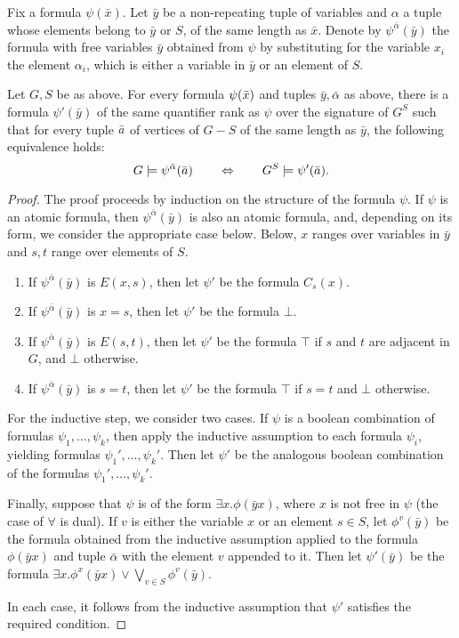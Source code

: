 Fix a formula $\psi(\bar x)$.
Let $\bar y$ be a non-repeating tuple of variables and $\alpha$ a tuple whose elements belong to $\bar y$ or $S$, of the same length as $\bar x$.
Denote by $\psi^{\bar \alpha}(\bar y)$ the formula with free variables $\bar y$ obtained from $\psi$ by substituting for the variable $x_i$ the element $\alpha_i$, which is either a variable in $\bar y$  or an element of $S$. 


\begin{lemma}\label{lem:remove-s}Let $G,S$ be as above.	
For every formula $\psi(\bar{x})$ and tuples $\bar y,\bar\alpha$ as above,
there is a formula $\psi'(\bar y)$ 
of the same quantifier rank as $\psi$ over the signature of $G^S$ 
 such that for every tuple $\bar{a}$ of vertices of $G-S$
 of the same length as $\bar y$,
the following equivalence holds:
$$G\models\psi^{\bar\alpha}(\bar{a})\qquad\Leftrightarrow\qquad G^S\models\psi'(\bar{a}).$$
\end{lemma}
\begin{proof}
The proof proceeds by induction on the structure of the formula $\psi$. If $\psi$ is an atomic formula,
then $\psi^{\bar \alpha}(\bar y)$ is also an atomic formula, and, depending on its form, 
we consider the appropriate case below. Below, $x$ ranges over variables in $\bar y$
and $s,t$ range over elements of $S$.
\begin{enumerate}
	\item If $\psi^{\bar \alpha}(\bar y)$ is $E(x,s)$, 
then let $\psi'$ be the formula $C_s(x)$.
\item If $\psi^{\bar \alpha}(\bar y)$ is $x=s$, then let $\psi'$
be the formula $\bot$. 
	\item If $\psi^{\bar \alpha}(\bar y)$ is $E(s,t)$, 
then let $\psi'$ be the formula $\top$ if $s$ and $t$ are adjacent in $G$, and $\bot$ otherwise. 
	\item If $\psi^{\bar \alpha}(\bar y)$ is $s=t$, 
then let $\psi'$ be the formula $\top$ if $s=t$ and $\bot$ otherwise. 
\end{enumerate}

For the inductive step, we consider two cases.
If $\psi$ is a boolean combination of formulas $\psi_1,\ldots,\psi_k$, then 
apply the inductive assumption to each formula $\psi_i$,
yielding formulas $\psi_1',\ldots,\psi_k'$. Then let $\psi'$ be the analogous boolean combination of the formulas $\psi_1',\ldots,\psi_k'$.

Finally, suppose that $\psi$ is of the form $\exists x.\phi(\bar y x)$, where $x$ is not free in $\psi$ (the case of $\forall$ is dual). If $v$ is either the variable $x$ 
or an element $s\in S$, 
let $\phi^v(\bar y)$ be the formula obtained from the inductive assumption applied to the formula $\phi(\bar y x)$ 
and tuple $\bar \alpha$ with the element $v$ appended to it.
Then let $\psi'(\bar y)$
be the formula $\exists x.\phi^x(\bar yx)\lor \bigvee_{v\in S}\phi^v(\bar y)$.

In each case, it follows from the inductive assumption that $\psi'$ 
satisfies the required condition.
\end{proof}



